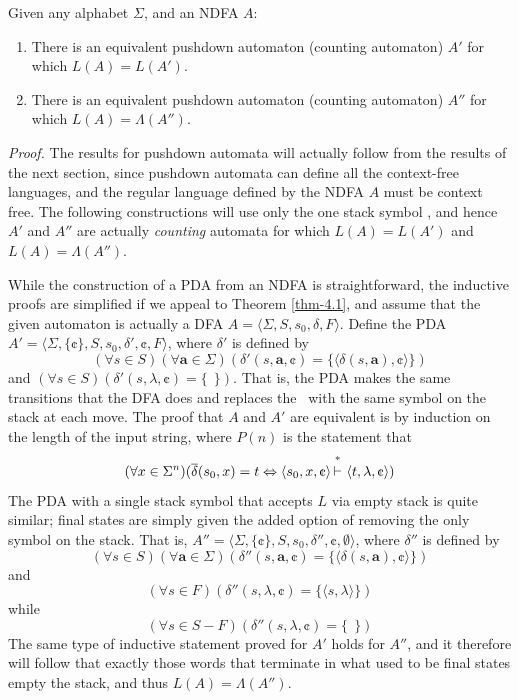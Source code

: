 \begin{thm}\label{thm-10.1}
Given any alphabet $\Sigma$, and an NDFA $A$:
\begin{enumerate}
\item There is an equivalent pushdown automaton (counting automaton) $A'$ for
which $L(A)=L(A')$.
\item There is an equivalent pushdown automaton (counting automaton) $A''$ for
which $L(A)=\Lambda(A'')$.
\end{enumerate}

\emph{Proof.} The results for pushdown automata will actually follow from the
results of the next section, since pushdown automata can define all the
context-free languages, and the regular language defined by the NDFA $A$ must be
context free. The following constructions will use only the one stack symbol
\cent, and hence $A'$ and $A''$ are actually \emph{counting} automata for which $L(A)=
L(A')$ and $L(A)=\Lambda(A'')$.

While the construction of a PDA from an NDFA is straightforward, the inductive
proofs are simplified if we appeal to Theorem \ref{thm-4.1}, and assume that the given
automaton is actually a DFA $A=\langle\Sigma,S,s_0,\delta,F\rangle$. Define the
PDA $A'=\langle\Sigma,\{\cent\},S,s_0,\delta',\cent,F\rangle$, where $\delta'$
is defined by
\[ (\forall s\in S)(\forall \pmb{a}\in\Sigma)(\delta'(s,\pmb{a},\cent)=\{\langle
	\delta(s,\pmb{a}),\cent\rangle\}) \]
and $(\forall s\in S)(\delta'(s,\lambda,\cent)=\{\ \ \})$. That is, the PDA makes
the same transitions that the DFA does and replaces the \cent\ with the same
symbol on the stack at each move. The proof that $A$ and $A'$ are equivalent is
by induction on the length of the input string, where $P(n)$ is the statement
that
\[ (\forall x\in\Sigma^n)(\DBAR(s_0,x)=t\Leftrightarrow\langle s_0,x,\cent
	\rangle\Dvdash\langle t,\lambda,\cent\rangle) \]
The PDA with a single stack symbol that accepts $L$ via empty stack is quite
similar; final states are simply given the added option of removing the only
symbol on the stack. That is, $A''=\langle\Sigma,\{\cent\},S,s_0,\delta'',\cent,
\emptyset\rangle$, where $\delta''$ is defined by
\[ (\forall s\in S)(\forall\pmb{a}\in\Sigma)(\delta''(s,\pmb{a},\cent)=\{\langle
	\delta(s,\pmb{a}),\cent\rangle\}) \]
and
\[ (\forall s\in F)(\delta''(s,\lambda,\cent)=\{\langle s,\lambda\rangle\}) \]
while
\[ (\forall s\in S-F)(\delta''(s,\lambda,\cent)=\{\ \ \}) \]
The same type of inductive statement proved for $A'$ holds for $A''$, and it
therefore will follow that exactly those words that terminate in what used to be
final states empty the stack, and thus $L(A)=\Lambda(A'')$.
\end{thm}

